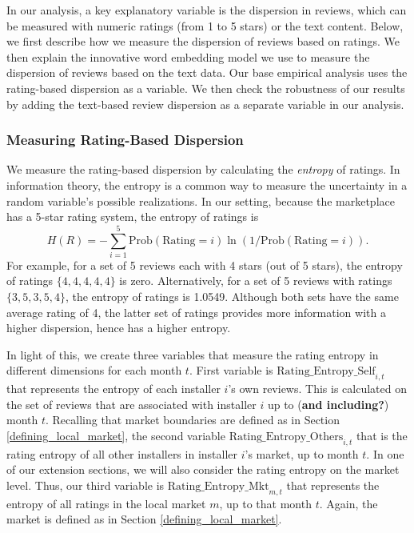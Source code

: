 \documentclass[msom,blindrev]{informs3}
\begin{document}
In our analysis, a key explanatory variable is the dispersion in reviews, which can be measured with numeric ratings (from 1 to 5 stars) or the text content. Below, we first describe how we measure the dispersion of reviews based on ratings. We then explain the innovative word embedding model we use to measure the dispersion of reviews based on the text data. Our base empirical analysis uses the rating-based dispersion as a variable. We then check the robustness of our results by adding the text-based review dispersion as a separate variable in our analysis.

\subsubsection{Measuring Rating-Based Dispersion} \label{Subsec: Define Ent}
We measure the rating-based dispersion by calculating the \emph{entropy} of ratings. In information theory, the entropy is a common way to measure  the uncertainty in a random variable's possible realizations. In our setting, because the marketplace has a 5-star rating system, the entropy of ratings is
\begin{equation}\label{def: entropy}
H(R)=-\sum_{i=1}^{5} \text{Prob}(\text{Rating}=i) \ln(1/\text{Prob}(\text{Rating}=i)).
\end{equation}
For example, for a set of 5 reviews each with 4 stars (out of 5 stars), the entropy of ratings $\{4,4,4,4,4\}$ is zero. Alternatively, for a set of 5 reviews with ratings $\{3,5,3,5,4\}$, the entropy of ratings is 1.0549. Although both sets have the same average rating of 4, the latter set of ratings provides more information with a higher dispersion, hence has a higher entropy.


In light of this, we create three variables that measure the rating entropy in different dimensions for each month $t$. First variable is $\text{Rating\_Entropy\_Self}_{i,t}$ that represents the entropy of each installer $i$'s own reviews. This is calculated on the set of reviews that are associated with installer $i$ up to (\textbf{and including?}) month $t$. Recalling that market boundaries are defined as in Section \ref{defining_local_market}, the second variable $\text{Rating\_Entropy\_Others}_{i,t}$ that is the rating entropy of all other installers in installer $i$'s market, up to month $t$. In one of our extension sections, we will also consider the rating entropy on the market level. Thus, our third variable is $\text{Rating\_Entropy\_Mkt}_{m,t}$ that represents the entropy of all ratings in the local market $m$, up to that month $t$.  Again, the market is defined as in Section \ref{defining_local_market}.
\end{document}

